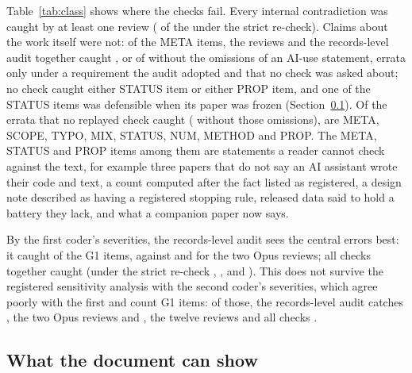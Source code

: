 \documentclass[11pt]{article}
\begin{document}
Table~\ref{tab:class} shows where the checks fail. Every internal contradiction was caught by at least one review (\StrictByClassConeInternal{} of the \NclassInternal{} under
the strict re-check). Claims about
the work itself were not: of the \NclassMeta{} META items, the reviews and the records-level audit together caught
\ByClassAllMeta, or \ByClassAllMetaNoNorm{} of \NclassMetaNoNorm{} without the \NnormDep{} omissions of an AI-use statement, errata only
under a requirement the audit adopted and that no check was asked about; no check caught either STATUS item or either PROP item, and one of the STATUS items was defensible when its paper was frozen
(Section~\ref{sec:freeze}). Of the \Nmissed{} errata that no replayed check caught (\NmissedNoNorm{} without those omissions),
\MissedMeta{} are META, \MissedScope{} SCOPE, \MissedTypo{} TYPO, \MissedMix{} MIX, \MissedStatus{} STATUS, \MissedNum{} NUM,
\MissedMethod{} METHOD and \MissedProp{} PROP. The META, STATUS and PROP items among them are statements a reader cannot check
against the text, for example three papers that do not say an AI assistant wrote their code and text, a count computed after the fact listed
as registered, a design note described as having a registered stopping rule, released data said to hold a battery they lack, and
what a companion paper now says.

By the first coder's severities, the records-level audit sees the central errors best: it caught \GoneCtwo{} of the \NsevGOne{} G1
items, against \GoneOpusA{} and \GoneOpusB{} for the two Opus reviews; all checks together caught \GoneAll{} (under the strict re-check \StrictGoneCtwo, \StrictGoneOpusA,
\StrictGoneOpusB{} and \StrictGoneAll). This does not survive the
registered sensitivity analysis with the second coder's severities, which agree poorly with the first and count \NsevGOneB{} G1
items: of those, the records-level audit catches \GoneCtwoB, the two Opus reviews \GoneOpusAB{} and \GoneOpusBB, the twelve reviews
\GoneConeB{} and all checks \GoneAllB.

\subsection{What the document can show}
\label{sec:freeze}
\end{document}
